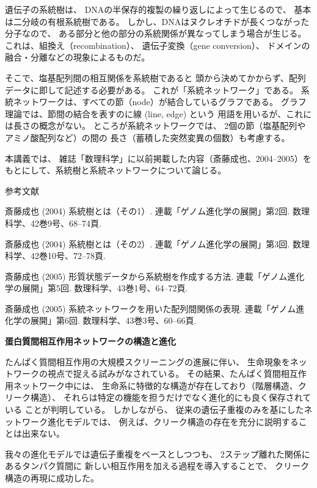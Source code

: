 \documentclass[uplatex,dvipdfmx]{jlreq}
\begin{document}
遺伝子の系統樹は、
DNAの半保存的複製の繰り返しによって生じるので、
基本は二分岐の有根系統樹である。
しかし、DNAはヌクレオチドが長くつながった分子なので、
ある部分と他の部分の系統関係が異なってしまう場合が生じる。
これは、組換え（recombination）、
遺伝子変換（gene conversion）、
ドメインの融合・分離などの現象によるものだ。

そこで、塩基配列間の相互関係を系統樹であると
頭から決めてかからず、配列データに即して記述する必要がある。
これが「系統ネットワーク」である。
系統ネットワークは、すべての節（node）が結合しているグラフである。
グラフ理論では、節間の結合を表すのに線 (line, edge) という
用語を用いるが、これには長さの概念がない。
ところが系統ネットワークでは、
2個の節（塩基配列やアミノ酸配列など）の間の
長さ（蓄積した突然変異の個数）も考慮する。

本講義では、
雑誌「数理科学」に以前掲載した内容（斎藤成也、2004--2005）を
もとにして、系統樹と系統ネットワークについて論じる。

\begin{center}\textsc{参考文献}\end{center}
\begin{enumerate}[{[1]}]
  \item 斎藤成也 (2004) 系統樹とは（その1）.
    連載「ゲノム進化学の展開」第2回.
    数理科学、42巻9号、68--74頁.
  \item 斎藤成也 (2004) 系統樹とは（その2）.
    連載「ゲノム進化学の展開」第3回.
    数理科学、42巻10号、72--78頁.
  \item 斎藤成也 (2005) 形質状態データから系統樹を作成する方法.
    連載「ゲノム進化学の展開」第5回.
    数理科学、43巻1号、64--72頁.
  \item 斎藤成也 (2005) 系統ネットワークを用いた配列間関係の表現.
    連載「ゲノム進化学の展開」第6回.
    数理科学、43巻3号、60--66頁.
\end{enumerate}

\vfill

\newpage

\begin{center}
{\large\bfseries 蛋白質間相互作用ネットワークの構造と進化}\\[6pt]
\hspace*{\fill}{\large\bfseries 田中 博（東京医科歯科大学 大学院疾患生命科学研究部）}
\end{center}

たんぱく質間相互作用の大規模スクリーニングの進展に伴い、
生命現象をネットワークの視点で捉える試みがなされている。
その結果、たんぱく質間相互作用ネットワーク中には、
生命系に特徴的な構造が存在しており（階層構造、クリーク構造）、
それらは特定の機能を担うだけでなく進化的にも良く保存されている
ことが判明している。
しかしながら、
従来の遺伝子重複のみを基にしたネットワーク進化モデルでは、
例えば、クリーク構造の存在を充分に説明することは出来ない。

我々の進化モデルでは遺伝子重複をベースとしつつも、
2ステップ離れた関係にあるタンパク質間に
新しい相互作用を加える過程を導入することで、
クリーク構造の再現に成功した。

\vfill
\end{document}
